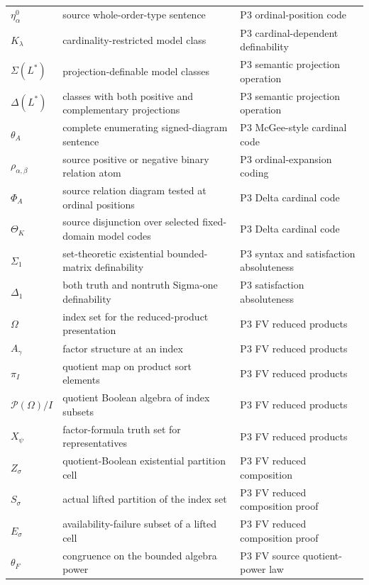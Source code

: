 \begin{longtable}{@{}p{}p{}p{}@{}}
\(\eta^0_\alpha\) & source whole-order-type sentence & P3 ordinal-\allowbreak{}position code \\
\(K_\lambda\) & cardinality-restricted model class & P3 cardinal-\allowbreak{}dependent definability \\
\(\Sigma(L^*)\) & projection-definable model classes & P3 semantic projection operation \\
\(\Delta(L^*)\) & classes with both positive and complementary projections & P3 semantic projection operation \\
\(\theta_A\) & complete enumerating signed-diagram sentence & P3 McGee-\allowbreak{}style cardinal code \\
\(\rho_{\alpha,\beta}\) & source positive or negative binary relation atom & P3 ordinal-\allowbreak{}expansion coding \\
\(\Phi_A\) & source relation diagram tested at ordinal positions & P3 Delta cardinal code \\
\(\Theta_K\) & source disjunction over selected fixed-domain model codes & P3 Delta cardinal code \\
\(\Sigma_1\) & set-theoretic existential bounded-matrix definability & P3 syntax and satisfaction absoluteness \\
\(\Delta_1\) & both truth and nontruth Sigma-one definability & P3 satisfaction absoluteness \\
\(\Omega\) & index set for the reduced-product presentation & P3 FV reduced products \\
\(A_\gamma\) & factor structure at an index & P3 FV reduced products \\
\(\pi_I\) & quotient map on product sort elements & P3 FV reduced products \\
\(\mathcal P(\Omega)/I\) & quotient Boolean algebra of index subsets & P3 FV reduced products \\
\(X_\psi\) & factor-formula truth set for representatives & P3 FV reduced products \\
\(Z_\sigma\) & quotient-Boolean existential partition cell & P3 FV reduced composition \\
\(S_\sigma\) & actual lifted partition of the index set & P3 FV reduced composition proof \\
\(E_\sigma\) & availability-failure subset of a lifted cell & P3 FV reduced composition proof \\
\(\theta_F\) & congruence on the bounded algebra power & P3 FV source quotient-\allowbreak{}power law \\

\end{longtable}
